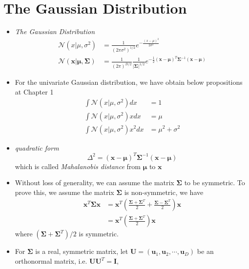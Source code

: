 \documentclass[12pt, a4paper]{article}
\begin{document}
    \section{The Gaussian Distribution}
    \begin{itemize}
        \item \textit{The Gaussian Distribution}
        \begin{align}
            \mathcal{N}(x|\mu,\sigma^2)&=\frac{1}{(2\pi\sigma^2)^{1/2}}e^{-\frac{(x-\mu)^2}
            {2\sigma^2}}\\
            \mathcal{N}(\bm{x}|\bm{\mu},\bm{\Sigma})&=\frac{1}{(2\pi)^{D/2}}\frac{1}{\vert
            \bm{\Sigma}\vert^{1/2}}e^{-\frac{1}{2}(\bm{x}-\bm{\mu})^T\bm{\Sigma}^{-1}
            (\bm{x}-\bm{\mu})}
        \end{align}
        \item For the univariate Gaussian distribution, we have obtain below propositions
        at Chapter 1
        \begin{align*}
            \int\mathcal{N}(x|\mu,\sigma^2)dx&=1\\
            \int\mathcal{N}(x|\mu,\sigma^2)xdx&=\mu\\
            \int\mathcal{N}(x|\mu,\sigma^2)x^2dx&=\mu^2+\sigma^2
        \end{align*}
        \item \textit{quadratic form}
        \begin{equation*}
            \Delta^2=(\bm{x}-\bm{\mu})^T\bm{\Sigma}^{-1}(\bm{x}-\bm{\mu})
        \end{equation*}
        which is called \textit{Mahalanobis distance} from $\bm{\mu}$ to $\bm{x}$
        \item Without loss of generality, we can assume the matrix $\bm{\Sigma}$ to be 
        symmetric. To prove this, we assume the matrix $\bm{\Sigma}$ is non-symmetric, 
        we have
        \begin{align*}
            \bm{x}^T\bm{\Sigma}\bm{x}&=\bm{x}^T(\frac{\bm{\Sigma}+\bm{\Sigma}^T}{2}+
            \frac{\bm{\Sigma}-\bm{\Sigma}^T}{2})\bm{x}\\
            &=\bm{x}^T(\frac{\bm{\Sigma}+\bm{\Sigma}^T}{2})\bm{x}
        \end{align*}
        where $(\bm{\Sigma}+\bm{\Sigma}^T)/2$ is symmetric.
        \item For $\bm{\Sigma}$ is a real, symmetric matrix, let $\bm{U}=(\bm{u}_1,
        \bm{u}_2,\cdots,\bm{u}_D)$ be an orthonormal matrix, i.e. $\bm{U}\bm{U}^T=\bm{I}$, 

\end{itemize}
\end{document}
